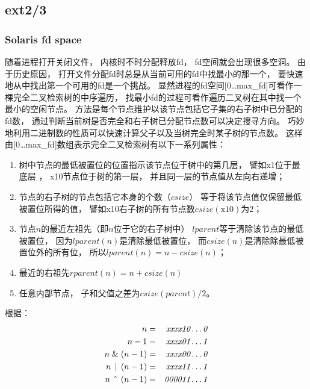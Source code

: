 \subsection{ext2/3}







\subsubsection{Solaris fd space}
随着进程打开关闭文件，
内核时不时分配释放fd，
fd空间就会出现很多空洞。
由于历史原因，
打开文件分配fd时总是从当前可用的fd中找最小的那一个，
要快速地从中找出第一个可用的fd是一个挑战。
显然进程的fd空间[0\dots {\sc max\_fd}]可看作一棵完全二叉检索树的中序遍历，
找最小fd的过程可看作遍历二叉树在其中找一个最小的空闲节点。
方法是每个节点维护以该节点包括它子集的右子树中已分配的fd数，
通过判断当前树是否完全和右子树已分配节点数可以决定搜寻方向。
巧妙地利用二进制数的性质可以快速计算父子以及当树完全时某子树的节点数。
这样由[0\dots {\sc max\_fd}]数组表示完全二叉检索树有以下一系列属性：

\begin{enumerate}
\item 树中节点的最低被置位的位置指示该节点位于树中的第几层，
  譬如x1位于最底层 ，
  x10节点位于树的第一层，
  并且同一层的节点值从左向右递增；
  
\item 节点的右子树的节点包括它本身的个数（$csize$）
  等于将该节点值仅保留最低被置位所得的值，
  譬如x10右子树的所有节点数$csize(\text{x10})$为2；
  
\item 节点$n$的最近左祖先（即$n$位于它的右子树中）
  $lparent$等于清除该节点的最低被置位，
  因为$lparent(n)$是清除最低被置位，
  而$csize(n)$是清除除最低被置位外的所有位，
  所以$lparent(n) = n - csize(n)$；
  
\item 最近的右祖先$rparent(n) = n + csize(n)$

\item 任意内部节点，
  子和父值之差为$csize(parent) / 2$。
\end{enumerate}

根据：
\begin{eqnarray}
  n &=& \textit{xxxx10}\dots{\it 0}\\
  n - 1 &=& \textit{xxxx01}\dots{\it 1}\\
  n \;\&\; (n - 1) &=& \textit{xxxx00}\dots{\it 0}\\
  n \,\mid\, (n - 1) &=& \textit{xxxx11}\dots{\it 1}\\
  n \,\XOR\, (n - 1) &=& \textit{000011}\dots{\it 1}
\end{eqnarray}

